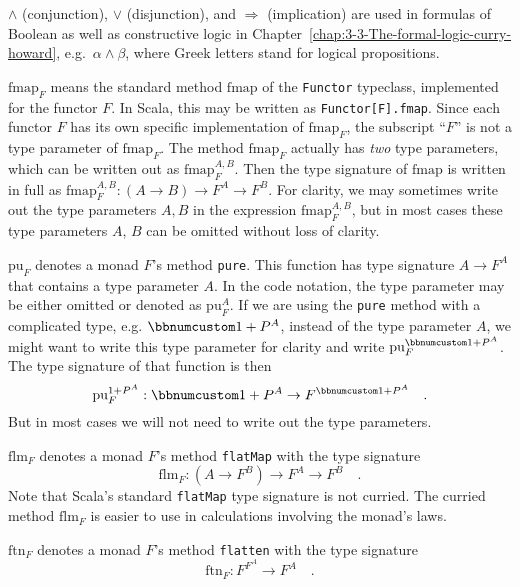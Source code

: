 $\wedge$ (conjunction), $\vee$ (disjunction), and $\Rightarrow$
(implication) are used in formulas of Boolean as well as constructive
logic in Chapter~\ref{chap:3-3-The-formal-logic-curry-howard}, e.g.~$\alpha\wedge\beta$,
where Greek letters stand for logical propositions.

$\text{fmap}_{F}$ means the standard method $\text{fmap}$ of the
\lstinline!Functor! typeclass, implemented for the functor $F$.
In Scala, this may be written as \texttt{}\lstinline!Functor[F].fmap!.
Since each functor $F$ has its own specific implementation of $\text{fmap}_{F}$,
the subscript ``$F$'' is not a type parameter of $\text{fmap}_{F}$.
The method $\text{fmap}_{F}$ actually has \emph{two} type parameters,
which can be written out as $\text{fmap}_{F}^{A,B}$. Then the type
signature of $\text{fmap}$ is written in full as $\text{fmap}_{F}^{A,B}:\left(A\rightarrow B\right)\rightarrow F^{A}\rightarrow F^{B}$.
For clarity, we may sometimes write out the type parameters $A,B$
in the expression $\text{fmap}_{F}^{A,B}$, but in most cases these
type parameters $A$, $B$ can be omitted without loss of clarity.

$\text{pu}_{F}$ denotes a monad $F$'s method \lstinline!pure!.
This function has type signature $A\rightarrow F^{A}$ that contains
a type parameter $A$. In the code notation, the type parameter may
be either omitted or denoted as $\text{pu}_{F}^{A}$. If we are using
the \lstinline!pure! method with a complicated type, e.g. $\bbnum 1+P^{A}$,
instead of the type parameter $A$, we might want to write this type
parameter for clarity and write $\text{pu}_{F}^{\bbnum 1+P^{A}}$.
The type signature of that function is then 
\[
\text{pu}_{F}^{1+P^{A}}:\bbnum 1+P^{A}\rightarrow F^{\bbnum 1+P^{A}}\quad.
\]
But in most cases we will not need to write out the type parameters.

$\text{flm}_{F}$ denotes a monad $F$'s method \lstinline!flatMap!
with the type signature
\[
\text{flm}_{F}:\left(A\rightarrow F^{B}\right)\rightarrow F^{A}\rightarrow F^{B}\quad.
\]
Note that Scala's standard \lstinline!flatMap! type signature is
not curried. The curried method $\text{flm}_{F}$ is easier to use
in calculations involving the monad's laws.

$\text{ftn}_{F}$ denotes a monad $F$'s method \lstinline!flatten!
with the type signature
\[
\text{ftn}_{F}:F^{F^{A}}\rightarrow F^{A}\quad.
\]

